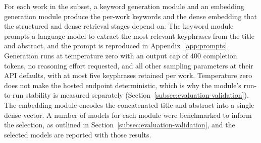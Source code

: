 For each work in the subset, a keyword generation module and an embedding generation module produce the per-work keywords and the dense embedding that the structured and dense retrieval stages depend on. The keyword module prompts a language model to extract the most relevant keyphrases from the title and abstract, and the prompt is reproduced in Appendix~\ref{app:prompts}. Generation runs at temperature zero with an output cap of 400 completion tokens, no reasoning effort requested, and all other sampling parameters at their API defaults, with at most five keyphrases retained per work. Temperature zero does not make the hosted endpoint deterministic, which is why the module's run-to-run stability is measured separately (Section~\ref{subsec:evaluation-validation}).
The embedding module encodes the concatenated title and abstract into a single dense vector. A number of models for each module were benchmarked to inform the selection, as outlined in Section~\ref{subsec:evaluation-validation}, and the selected models are reported with those results.

